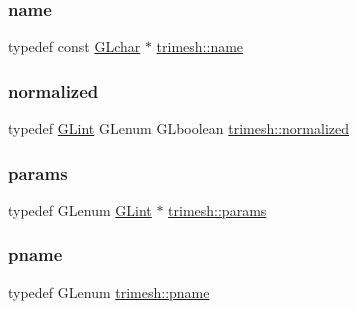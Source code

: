 \mbox{\label{namespacetrimesh_a7f24cdcfa73387d7fa6aa44676238a79}} 
\subsubsection{\texorpdfstring{name}{name}}
{\footnotesize\ttfamily typedef const \hyperlink{namespacetrimesh_ae0c0512592dbcadf9b11efef0409d165}{G\+Lchar} $\ast$ \hyperlink{namespacetrimesh_a7f24cdcfa73387d7fa6aa44676238a79}{trimesh\+::name}}

\mbox{\label{namespacetrimesh_a3dae7368e1a76b54d81a4c8abd70559b}} 
\subsubsection{\texorpdfstring{normalized}{normalized}}
{\footnotesize\ttfamily typedef \hyperlink{namespacetrimesh_aeccc290e30b317c861fb146956528187}{G\+Lint} G\+Lenum G\+Lboolean \hyperlink{namespacetrimesh_a3dae7368e1a76b54d81a4c8abd70559b}{trimesh\+::normalized}}

\mbox{\label{namespacetrimesh_a89b05d2526a1a9c3edb62082b6e8ec17}} 
\subsubsection{\texorpdfstring{params}{params}}
{\footnotesize\ttfamily typedef G\+Lenum \hyperlink{namespacetrimesh_aeccc290e30b317c861fb146956528187}{G\+Lint} $\ast$ \hyperlink{namespacetrimesh_a89b05d2526a1a9c3edb62082b6e8ec17}{trimesh\+::params}}

\mbox{\label{namespacetrimesh_aa9a53df049d69c8296a2b988a842153b}} 
\subsubsection{\texorpdfstring{pname}{pname}}
{\footnotesize\ttfamily typedef G\+Lenum \hyperlink{namespacetrimesh_aa9a53df049d69c8296a2b988a842153b}{trimesh\+::pname}}

\mbox{\label{namespacetrimesh_a325b99fd6454b22fa4c4bc3223271b2c}} 
